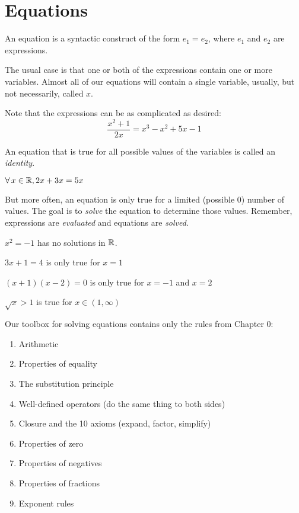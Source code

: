 \documentclass[letterpaper,12pt,fleqn]{article}
\begin{document}
\section*{Equations}

\begin{definition}
  An equation is a syntactic construct of the form $e_1=e_2$, where $e_1$ and
  $e_2$ are expressions.
\end{definition}

The usual case is that one or both of the expressions contain one or more
variables. Almost all of our equations will contain a single variable,
usually, but not necessarily, called $x$.

\begin{example}
  Note that the expressions can be as complicated as desired:
  \[\frac{x^2+1}{2x}=x^3-x^2+5x-1\]
\end{example}

\begin{definition}
  An equation that is true for all possible values of the variables is called
  an \emph{identity}.
\end{definition}

\begin{example}
  $\forall\,x\in\mathbb{R},2x+3x=5x$
\end{example}

But more often, an equation is only true for a limited (possible 0) number of
values. The goal is to \emph{solve} the equation to determine those values.
Remember, expressions are \emph{evaluated} and equations are \emph{solved}.

\begin{example}
  $x^2=-1$ has no solutions in $\mathbb{R}$.

  $3x+1=4$ is only true for $x=1$

  $(x+1)(x-2)=0$ is only true for $x=-1$ and $x=2$

  $\sqrt{x}>1$ is true for $x\in(1,\infty)$
\end{example}

Our toolbox for solving equations contains only the rules from Chapter 0:
\begin{enumerate}
\item Arithmetic
\item Properties of equality
\item The substitution principle
\item Well-defined operators (do the same thing to both sides)
\item Closure and the 10 axioms (expand, factor, simplify)
\item Properties of zero
\item Properties of negatives
\item Properties of fractions
\item Exponent rules
\end{enumerate}
\end{document}
